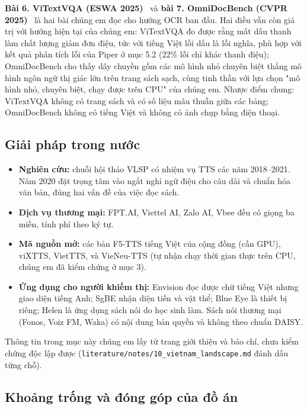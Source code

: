 \documentclass[12pt,a4paper]{article}
\providecommand{\tightlist}{\setlength{\itemsep}{2pt}\setlength{\parskip}{0pt}}
\begin{document}
\textbf{Bài 6. ViTextVQA (ESWA 2025)}~\cite{b6} và \textbf{bài 7. OmniDocBench (CVPR 2025)}~\cite{b7} là hai bài chúng em đọc cho hướng OCR ban đầu. Hai điều vẫn còn giá trị với hướng hiện tại của chúng em: ViTextVQA đo được rằng mất dấu thanh làm chất lượng giảm đơn điệu, tức với tiếng Việt lỗi dấu là lỗi nghĩa, phù hợp với kết quả phân tích lỗi của Piper ở mục 5.2 (22\% lỗi chỉ khác thanh điệu); OmniDocBench cho thấy dây chuyền gồm các mô hình nhỏ chuyên biệt thắng mô hình ngôn ngữ thị giác lớn trên trang sách sạch, cùng tinh thần với lựa chọn "mô hình nhỏ, chuyên biệt, chạy được trên CPU" của chúng em. Nhược điểm chung: ViTextVQA không có trang sách và có số liệu mâu thuẫn giữa các bảng; OmniDocBench không có tiếng Việt và không có ảnh chụp bằng điện thoại.

\subsection{Giải pháp trong nước}

\begin{itemize}
\tightlist
\item
  \textbf{Nghiên cứu:} chuỗi hội thảo VLSP có nhiệm vụ TTS các năm 2018--2021. Năm 2020 đặt trọng tâm vào ngắt nghỉ ngữ điệu cho câu dài và chuẩn hóa văn bản, đúng hai vấn đề của việc đọc sách.
\item
  \textbf{Dịch vụ thương mại:} FPT.AI, Viettel AI, Zalo AI, Vbee đều có giọng ba miền, tính phí theo ký tự.
\item
  \textbf{Mã nguồn mở:} các bản F5-TTS tiếng Việt của cộng đồng (cần GPU), viXTTS, VietTTS, và VieNeu-TTS (tự nhận chạy thời gian thực trên CPU, chúng em đã kiểm chứng ở mục 3).
\item
  \textbf{Ứng dụng cho người khiếm thị:} Envision đọc được chữ tiếng Việt nhưng giao diện tiếng Anh; SgBE nhận diện tiền và vật thể; Blue Eye là thiết bị riêng; Helen là ứng dụng sách nói do học sinh làm. Sách nói thương mại (Fonos, Voiz FM, Waka) có nội dung bản quyền và không theo chuẩn DAISY.
\end{itemize}

Thông tin trong mục này chúng em lấy từ trang giới thiệu và báo chí, chưa kiểm chứng độc lập được (\texttt{literature/notes/10\_vietnam\_landscape.md} đánh dấu từng chỗ).

\subsection{Khoảng trống và đóng góp của đồ án}
\end{document}
